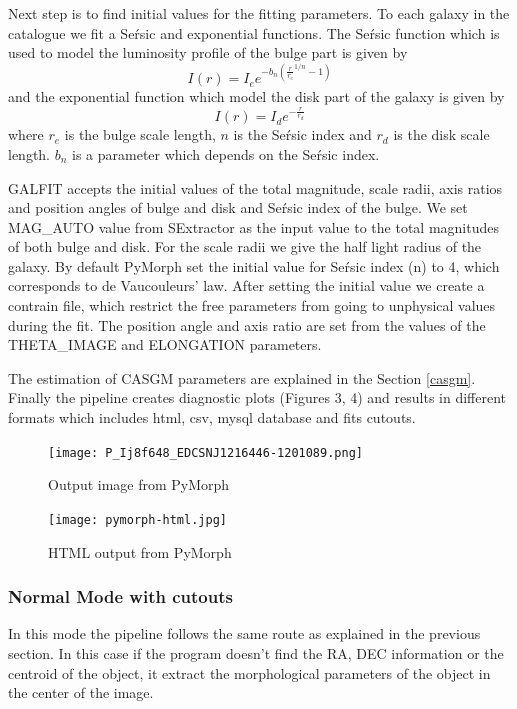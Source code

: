 \documentclass[a4paper,10pt]{article}
\begin{document}
Next step is to find initial values for the fitting parameters.
To each galaxy in the catalogue we fit a Se\'rsic and exponential functions.
The Se\'rsic function which is used to model the luminosity profile of the bulge part is given by
\begin{equation}
 I(r) = I_e e^{-b_n (\frac{r}{r_e}^{1/n} - 1)}
\end{equation}
 and the exponential function which model the disk part of the galaxy is given by
\begin{equation}
 I(r) = I_d e^{-\frac{r}{r_d}}
\end{equation}
where $r_e$ is the bulge scale length, $n$ is the Se\'rsic index and $r_d$ is the disk scale length. $b_n$ is a parameter which depends on the Se\'rsic index.

GALFIT accepts the initial values of the total magnitude, scale radii, axis ratios and position angles of bulge and disk and Se\'rsic index of the bulge.
We set MAG\_AUTO value from SExtractor as the input value to the total magnitudes of both bulge and disk.
For the scale radii we give the half light radius of the galaxy.
By default PyMorph set the initial value for Se\'rsic index (n) to 4, which corresponds to de Vaucouleurs' law.
After setting the initial value we create a contrain file, which restrict the free parameters from going to unphysical values during the fit.
The position angle and axis ratio are set from the values of the THETA\_IMAGE and ELONGATION parameters.

The estimation of CASGM parameters are explained in the Section \ref{casgm}. Finally the pipeline creates diagnostic plots (Figures 3, 4) and results in different formats which includes html, csv, mysql database and fits cutouts.
\begin{figure}
 \centering
 \texttt{[image: P\_Ij8f648\_EDCSNJ1216446-1201089.png]}
 \label{fig:output}
\caption{Output image from PyMorph}
\end{figure}

\begin{figure}
 \centering
 \texttt{[image: pymorph-html.jpg]}
 \label{fig:html}
\caption{HTML output from PyMorph}
\end{figure}
\subsubsection{Normal Mode with cutouts}
 In this mode the pipeline follows the same route as explained in the previous section. In this case if the program doesn't find the RA, DEC information or the centroid of the object, it extract the morphological parameters of the object in the center of the image. 
\end{document}
